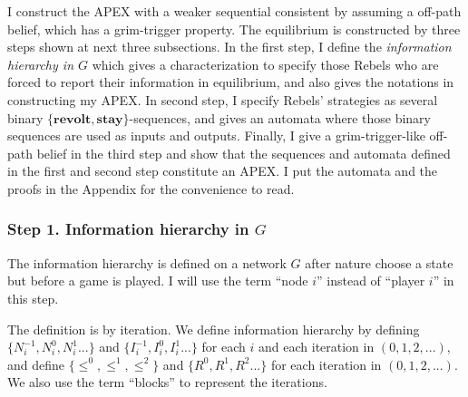 \documentclass[12pt,letter]{article}
\theoremstyle{definition}
\theoremstyle{remark}
\theoremstyle{claim}
\begin{document}
I construct the APEX with a weaker sequential consistent by assuming a off-path belief, which has a grim-trigger property. The equilibrium is constructed by three steps shown at next three subsections. In the first step, I define the \textit{information hierarchy in $G$} which gives a characterization to specify those Rebels who are forced to report their information in equilibrium, and also gives the notations in constructing my APEX. In second step, I specify Rebels' strategies as several binary $\{\textbf{revolt},\textbf{stay}\}$-sequences, and gives an automata where those binary sequences are used as inputs and outputs. Finally, I give a grim-trigger-like off-path belief in the third step and show that the sequences and automata defined in the first and second step constitute an APEX. I put the automata and the proofs in the Appendix for the convenience to read.

\subsubsection{Step 1. Information hierarchy in $G$}

The information hierarchy is defined on a network $G$ after nature choose a state but before a game is played. I will use the term ``node $i$'' instead of ``player $i$'' in this step.

The definition is by iteration. We define information hierarchy by defining $\{N^{-1}_i,N^{0}_i, N^{1}_i...\}$ and $\{I^{-1}_i,I^{0}_i, I^{1}_i...\}$ for each $i$ and each iteration in $(0,1,2,...)$, and define $\{\leq^0, \leq^1, \leq^2\}$ and $\{R^0,R^{1}, R^{2}...\}$ for each iteration in $(0,1,2,...)$. We also use the term ``blocks'' to represent the iterations.
\end{document}
